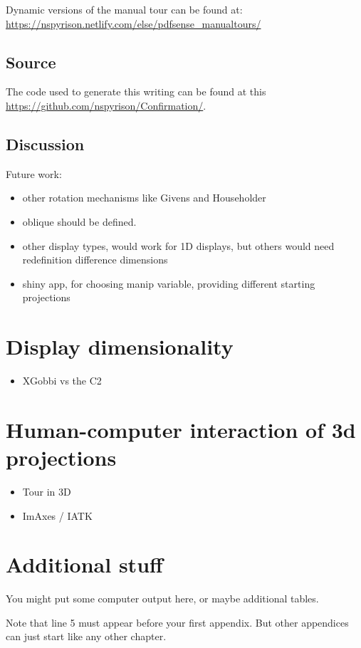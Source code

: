 \documentclass{monashthesis}
\begin{document}
Dynamic versions of the manual tour can be found at:
\url{https://nspyrison.netlify.com/else/pdfsense_manualtours/}

\section{Source}\label{source}

The code used to generate this writing can be found at this
\url{https://github.com/nspyrison/Confirmation/}.

\section{Discussion}\label{discussion}

Future work:

\begin{itemize}
\tightlist
\item
  other rotation mechanisms like Givens and Householder
\item
  oblique should be defined.
\item
  other display types, would work for 1D displays, but others would need
  redefinition difference dimensions
\item
  shiny app, for choosing manip variable, providing different starting
  projections
\end{itemize}

\chapter{Display dimensionality}\label{ch:disp_dim}

\begin{itemize}
\tightlist
\item
  XGobbi vs the C2
\end{itemize}

\chapter{Human-computer interaction of 3d
projections}\label{ch:hci_3dproj}

\begin{itemize}
\tightlist
\item
  Tour in 3D
\item
  ImAxes / IATK
\end{itemize}

\appendix

\chapter{Additional stuff}\label{additional-stuff}

You might put some computer output here, or maybe additional tables.

Note that line 5 must appear before your first appendix. But other
appendices can just start like any other chapter.

\printbibliography[heading=bibintoc]
\end{document}
